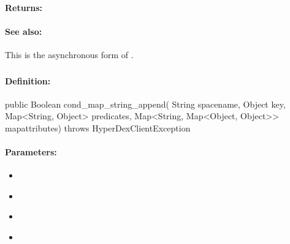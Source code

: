 \paragraph{Returns:}


\paragraph{See also:}  This is the asynchronous form of .

\pagebreak
\subsubsection{}
\label{api:java:cond_map_string_append}


\paragraph{Definition:}
\begin{javacode}
public Boolean cond_map_string_append(
        String spacename,
        Object key,
        Map<String, Object> predicates,
        Map<String, Map<Object, Object>> mapattributes) throws HyperDexClientException
\end{javacode}

\paragraph{Parameters:}
\begin{itemize}[noitemsep]
\item {}\\

\item {}\\

\item {}\\

\item {}\\

\end{itemize}

